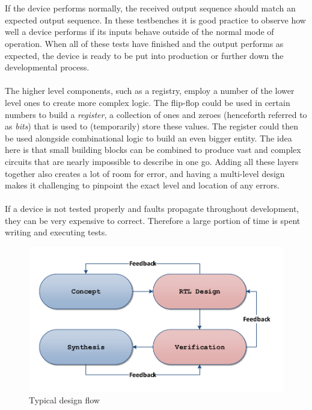 \documentclass[11pt,british]{article}
\begin{document}
\\
\\
If the device performs normally, the received output sequence should match an expected output sequence. In these testbenches it is good practice to observe how well a device performs if its inputs behave outside of the normal mode of operation. When all of these tests have finished and the output performs as expected, the device is ready to be put into production or further down the developmental process.\cite{vhdldebug}
\\
\\
The higher level components, such as a registry, employ a number of the lower level ones to create more complex logic.\cite{vhdlsynth3} The flip-flop could be used in certain numbers to build a \emph{register}, a collection of ones and zeroes (henceforth referred to as \emph{bits}) that is used to (temporarily) store these values. The register could then be used alongside combinational logic to build an even bigger entity. The idea here is that small building blocks can be combined to produce vast and complex circuits that are nearly impossible to describe in one go.\cite{vhdlhierarchy} Adding all these layers together also creates a lot of room for error, and having a multi-level design makes it challenging to pinpoint the exact level and location of any errors. 
\\
\\
If a device is not tested properly and faults propagate throughout development, they can be very expensive to correct.\cite{weber06} Therefore a large portion of time is spent writing and executing tests.
\begin{figure}[h]
    \centering
	\includegraphics[width=.7\textwidth]{images/designflow.pdf}
    \caption{Typical design flow}
    \label{fig:Design_Flow}
\end{figure}

\newpage

\end{document}
